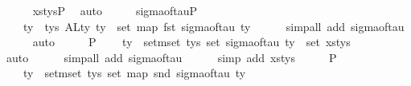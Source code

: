 \begin{isabellebody}
\ \ \ \ \isamarkupfalse%
\ xs{\isacharunderscore}{\kern0pt}tys{\isacharunderscore}{\kern0pt}P{}\ \isamarkupfalse%
\ auto\isanewline
\ \ \isamarkupfalse%
\ \isamarkupfalse%
\ sigma{\isacharunderscore}{\kern0pt}of{\isacharunderscore}{\kern0pt}tau{\isacharunderscore}{\kern0pt}P{}{\isacharcolon}{\kern0pt}\isanewline
\ \ \ \ {\isachardoublequoteopen}{\isasymforall}ty\ {\isasymin}{\isacharhash}{\kern0pt}\ tys{\isachardot}{\kern0pt}\ {\isacharparenleft}{\kern0pt}ALty\ ty\ {\isacharequal}{\kern0pt}\ set\ {\isacharparenleft}{\kern0pt}map\ fst\ {\isacharparenleft}{\kern0pt}sigma{\isacharunderscore}{\kern0pt}of{\isacharunderscore}{\kern0pt}tau\ ty{\isacharparenright}{\kern0pt}{\isacharparenright}{\kern0pt}{\isacharparenright}{\kern0pt}{\isachardoublequoteclose}\isanewline
\ \ \ \ \isamarkupfalse%
\ {\isacharparenleft}{\kern0pt}simp{\isacharunderscore}{\kern0pt}all\ add{\isacharcolon}{\kern0pt}\ sigma{\isacharunderscore}{\kern0pt}of{\isacharunderscore}{\kern0pt}tau{\isacharparenright}{\kern0pt}\isanewline
\ \ \ \ \isamarkupfalse%
\ auto\isanewline
\isanewline
\ \ \isamarkupfalse%
\ \isamarkupfalse%
\ P{}{\isacharcolon}{\kern0pt}\isanewline
\ \ \ \ {\isachardoublequoteopen}{\isacharparenleft}{\kern0pt}{\isasymUnion}ty\ {\isasymin}\ set{\isacharunderscore}{\kern0pt}mset\ tys{\isachardot}{\kern0pt}\ set\ {\isacharparenleft}{\kern0pt}sigma{\isacharunderscore}{\kern0pt}of{\isacharunderscore}{\kern0pt}tau\ ty{\isacharparenright}{\kern0pt}{\isacharparenright}{\kern0pt}\ {\isacharequal}{\kern0pt}\ set\ xs{\isacharunderscore}{\kern0pt}tys{\isachardoublequoteclose}\isanewline
\ \ \ \ \isamarkupfalse%
\ auto\isanewline
\ \ \ \ \isamarkupfalse%
\ {\isacharparenleft}{\kern0pt}simp{\isacharunderscore}{\kern0pt}all\ add{\isacharcolon}{\kern0pt}\ sigma{\isacharunderscore}{\kern0pt}of{\isacharunderscore}{\kern0pt}tau{\isacharparenright}{\kern0pt}\isanewline
\ \ \ \ \isamarkupfalse%
\ {\isacharparenleft}{\kern0pt}simp\ add{\isacharcolon}{\kern0pt}\ xs{\isacharunderscore}{\kern0pt}tys{\isacharparenright}{\kern0pt}\isanewline
\ \ \isamarkupfalse%
\ \isamarkupfalse%
\ P{}{}{\isacharcolon}{\kern0pt}\isanewline
\ \ \ \ {\isachardoublequoteopen}{\isacharparenleft}{\kern0pt}{\isasymUnion}ty\ {\isasymin}\ set{\isacharunderscore}{\kern0pt}mset\ tys{\isachardot}{\kern0pt}\ {\isacharparenleft}{\kern0pt}set\ {\isacharparenleft}{\kern0pt}map\ snd\ {\isacharparenleft}{\kern0pt}sigma{\isacharunderscore}{\kern0pt}of{\isacharunderscore}{\kern0pt}tau\ ty{\isacharparenright}{\kern0pt}{\isacharparenright}{\kern0pt}{\isacharparenright}{\kern0pt}{\isacharparenright}{\kern0pt}\ {\isacharequal}{\kern0pt}\isanewline

\end{isabellebody}
